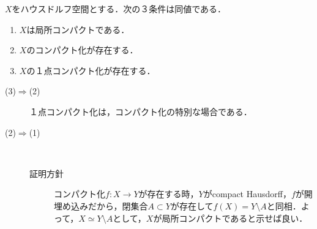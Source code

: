 \documentclass[uplatex,dvipdfmx]{jsreport}
\begin{document}
\begin{proposition}\label{prop-one-point-compactification}
    $X$をハウスドルフ空間とする．次の３条件は同値である．
    \begin{enumerate}
        \item $X$は局所コンパクトである．
        \item $X$のコンパクト化が存在する．
        \item $X$の１点コンパクト化が存在する．
    \end{enumerate}
\end{proposition}
\begin{Proof}\mbox{}
    \begin{description}
        \item[(3)$\Rightarrow$(2)] １点コンパクト化は，コンパクト化の特別な場合である．
        \item[(2)$\Rightarrow$(1)] \mbox{}\\
        \begin{description}
            \item[証明方針] 
            コンパクト化$f:X\to Y$が存在する時，$Y$がcompact Hausdorff，$f$が開埋め込みだから，閉集合$A\subset Y$が存在して$f(X)=Y\setminus A$と同相．よって，$X\simeq Y\setminus A$として，$X$が局所コンパクトであると示せば良い．
            

\end{description}
\end{description}
\end{Proof}
\end{document}
